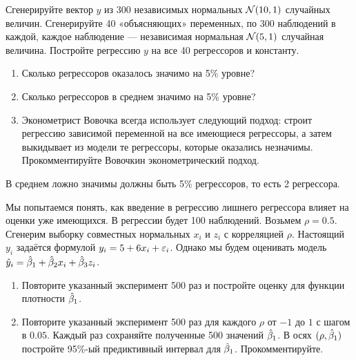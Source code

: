 \begin{problem}
Сгенерируйте вектор $y$ из 300 независимых нормальных $\mathcal{N}(10,1)$ случайных величин.
Сгенерируйте 40 «объясняющих» переменных, по 300 наблюдений в каждой, каждое наблюдение — независимая нормальная $\mathcal{N}(5,1)$ случайная величина. Постройте регрессию $y$ на все 40 регрессоров и константу.
\begin{enumerate}
\item Сколько регрессоров оказалось значимо на 5\% уровне?
\item Сколько регрессоров в среднем значимо на 5\% уровне?
\item Эконометрист Вовочка всегда использует следующий подход: строит регрессию зависимой переменной на все имеющиеся регрессоры, а затем выкидывает из модели те регрессоры, которые оказались незначимы. Прокомментируйте Вовочкин эконометрический подход.
\end{enumerate}


\begin{sol}
В среднем ложно значимы должны быть 5\% регрессоров, то есть 2 регрессора.
\end{sol}
\end{problem}



\begin{problem}
Мы попытаемся понять, как введение в регрессию лишнего регрессора влияет на оценки уже имеющихся. В регрессии будет 100 наблюдений. Возьмем $\rho=0.5$. Сгенерим выборку совместных нормальных $x_i$ и $z_i$ с корреляцией $\rho$. Настоящий $y_i$ задаётся формулой $y_i=5+6x_i+\varepsilon_i$. Однако мы будем оценивать модель $\hat{y}_i=\hat{\beta}_1+\hat{\beta}_2 x_i+\hat{\beta}_3 z_i$.

\begin{enumerate}
\item Повторите указанный эксперимент 500 раз и постройте оценку для функции плотности $\hat{\beta}_1$.
\item Повторите указанный эксперимент 500 раз для каждого $\rho$ от $-1$ до $1$ с шагом в $0.05$. Каждый раз сохраняйте полученные 500 значений $\hat{\beta}_1$. В осях $(\rho,\hat{\beta}_1)$ постройте 95\%-ый предиктивный интервал для $\hat{\beta}_1$. Прокомментируйте.
\end{enumerate}


\begin{sol}
\end{sol}
\end{problem}



